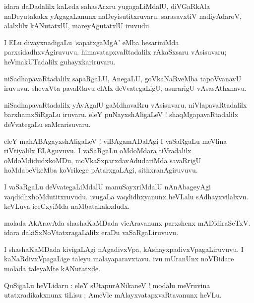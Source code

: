 \documentclass{article}
\begin{document}
\begin{mn}
idara daDadalilx kaLeda sahasArxru yugagaLiMdalU, diVGaRkAla naDeyutakakx 
yAgagaLanunx naDeyisutitxruvaru. sarasavxtiV nadiyAdaroV, alalxlilx kANutatxlU,
mareyAgutatxlU iruvudu.
\end{mn}

\begin{mn}
I ELu divayxnadigaLu `sapatxgaMgA' eMba hesariniMda parxsidadhxvAgiruvuvu. 
himavatapxvaRtadalilx rAkaSxsaru vAsisuvaru; heVmakUTadalilx guhayxkariruvaru.
\end{mn}

\begin{mn}
niSadhapavaRtadalilx sapaRgaLU, AnegaLU, goVkaNaRveMba tapoVvanavU iruvuvu.
shevxVta pavaRtavu elAlx deVvategaLigU, asurarigU vAsasAthxnavu.
\end{mn}

\begin{mn}
niSadhapavaRtadalilx yAvAgalU gaMdhavaRru vAsisuvaru.
niVlapavaRtadalilx barxhamxSiRgaLu iruvaru. eleY puNayxshAligaLeV ! 
shaqMgapavaRtadalilx deVvategaLu saMcarisuvaru.
\end{mn}

\begin{mn}
eleY mahABAgayxshAligaLeV ! viBAgamADalAgi I vaSaRgaLu meVlina riVtiyalilx ELAguvuvu.
I vaSaRgaLu  oMdoMdara tiVradalilx oMdoMdidudxkoMDu, moVkaSxparxdavAdudariMda savaRrigU
hoMdabeVkeMba koVrikege pAtarxgaLAgi, sithxranAgiruvuvu.
\end{mn}

\begin{mn}
I vaSaRgaLu deVvategaLiMdalU manuSayxriMdalU nAnAbageyAgi vaqdidhxhoMdutitxruvudu. 
ivugaLa vaqdidhxyanunx heVLalu sAdhayxvilalxvu. keVLuva iceCxyiMda naMbatakakxdudx.
\end{mn}

\begin{mn}
molada AkAravAda shashaKaMDada  vicAravanunx parxshenx mADidiraSeTxV. 
idara dakiSxNoVtatxragaLalilx eraDu vaSaRgaLiruvuvu.
\end{mn}

\begin{mn}
I shashaKaMDada kivigaLAgi nAgadivxVpa, kAshayxpadivxVpagaLiruvuvu. 
I kaNaRdivxVpagaLige taleyu malayaparavxtavu.
ivu mUranUnx noVDidare molada taleyaMte kANutatxde.
\end{mn}


\begin{mn}
QuSigaLu heVLidaru : eleY sUtapurANikaneV ! modalu meVruvina utatxradikakxnunx tiLisu ;
AmeVle mAlayxvatapxvaRtavanunx heVLu.
\end{mn}
\end{document}
